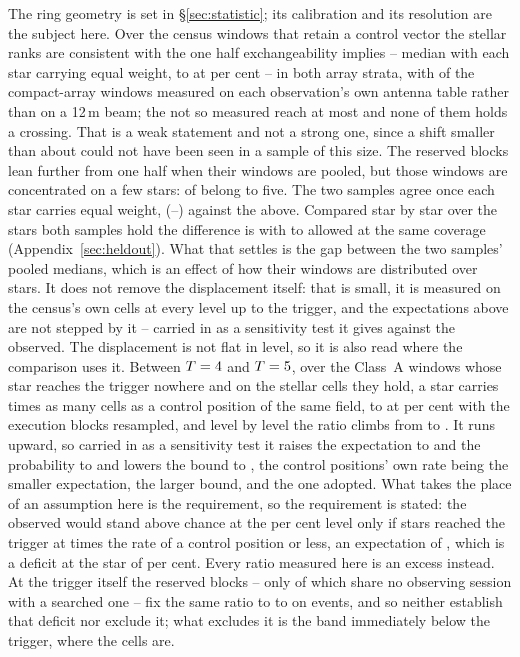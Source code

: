 The ring geometry is set in \S\ref{sec:statistic}; its calibration and its
resolution are the subject here. Over the \VerNTested{} census windows that
retain a control vector the stellar ranks are consistent with the one half
exchangeability implies -- median \BkRankBalSurv{} with each star carrying
equal weight, \BkRankBalSurvLo{} to \BkRankBalSurvHi{} at \CeCovPct{} per
cent -- in both array
strata, with \FrNAcaOwn{} of the \FrNAcaRow{} compact-array windows measured
on each observation's own antenna table rather than on a 12\,m beam; the
\FrNAcaOther{} not so measured reach \FrAcaMaxT{} at most and none of them
holds a crossing. That is a weak statement and not a strong
one, since a shift smaller than about \VerKsPowerAca{} could not have been
seen in a sample of this size. The reserved blocks lean further from one half
when their windows are pooled, but those windows are concentrated on a few
stars: \BkRankTopFiveWin{} of \HoWin{} belong to five. The two
samples agree once each star carries equal weight, \BkRankBalHo{}
(\BkRankBalHoLo--\BkRankBalHoHi) against the \BkRankBalSurv{} above.
Compared star by star over the \BkRankPairedStars{} stars both samples hold
the difference is \BkRankPaired{} with \BkRankPairedLo{} to
\BkRankPairedHi{} allowed at the same coverage
(Appendix~\ref{sec:heldout}). What that settles is
the gap between the two samples' pooled medians, which is an effect of how
their windows are distributed over stars. It does not remove the displacement
itself: that is small, it is measured on the census's own cells at every level
up to the trigger, and the expectations above are not stepped by it -- carried
in as a sensitivity test it gives \CeExpX{} against the \CeObs{} observed.
The displacement is not flat in level, so it is also read where the comparison
uses it. Between $T=4$ and $T=5$, over the
\CeNearNWin{} Class~A windows whose star reaches the trigger nowhere and on
the \CeNearNStar{} stellar cells they hold, a star carries \CeNear{} times as
many cells as a control position of the same field, \CeNearIntLo{} to
\CeNearIntHi{} at \CeCovPct{} per cent with the execution blocks resampled,
and level by level the ratio climbs from \CeNearRiseLo{} to \CeNearRiseHi{}.
It runs upward, so carried in as a sensitivity test it raises the expectation
to \CeExpNear{} and the probability to \CeProbNear{} and lowers the bound to
\CeAddLimNear, the control positions' own rate being the smaller expectation,
the larger bound, and the one adopted. What takes the place of an assumption
here is the requirement, so the requirement is stated: the \CeObs{} observed
would stand above chance at the \CeAlphaPct{} per cent level only if stars
reached the trigger at \CeRCrit{} times the rate of a control position or
less, an expectation of \CeRCritExp{}, which is a deficit at the star of
\CeRCritPct{} per cent. Every ratio measured here is an excess instead. At
the trigger itself the reserved blocks -- only \HsIndBlocks{} of which share
no observing session with a searched one -- fix the same ratio to \StHoLo{}
to \StHoHi{} on \StHoObs{} events, and so neither establish that deficit
nor exclude it; what excludes it is the band immediately below the trigger,
where the cells are.

